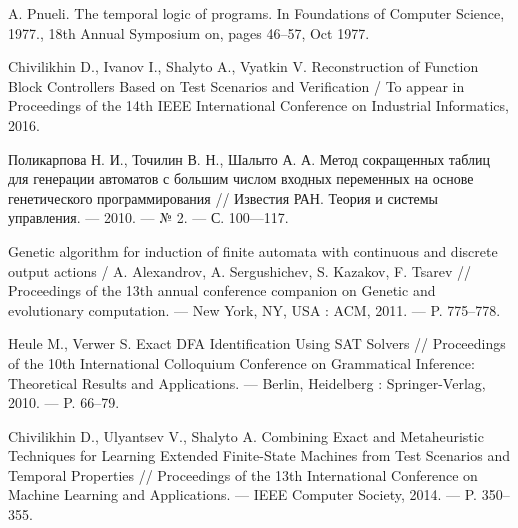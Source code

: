 \documentclass[14pt]{extarticle}
\theoremstyle{plain}
\theoremstyle{definition}
\begin{document}
\begin{thebibliography}{99}
A. Pnueli. The temporal logic of programs.
In Foundations of Computer Science, 1977., 18th Annual Symposium on, pages 46–57, Oct 1977.

Chivilikhin D., Ivanov I., Shalyto A., Vyatkin V. Reconstruction of Function Block
Controllers Based on Test Scenarios and Verification / To appear in Proceedings of
the 14th IEEE International Conference on Industrial Informatics, 2016.

Поликарпова Н. И., Точилин В. Н., Шалыто А. А.
Метод сокращенных таблиц для генерации автоматов с большим числом входных
переменных на основе генетического программирования // Известия РАН.
Теория и системы управления. — 2010. — № 2. — С. 100—117.

Genetic algorithm for induction of finite automata with continuous and
discrete output actions / A. Alexandrov, A. Sergushichev, S. Kazakov,
F. Tsarev // Proceedings of the 13th annual conference companion on
Genetic and evolutionary computation. — New York, NY, USA : ACM,
2011. — P. 775–778.

Heule M., Verwer S. Exact DFA Identification Using SAT Solvers // Proceedings
of the 10th International Colloquium Conference on Grammatical
Inference: Theoretical Results and Applications. — Berlin, Heidelberg
: Springer-Verlag, 2010. — P. 66–79.

Chivilikhin D., Ulyantsev V., Shalyto A. Combining Exact and Metaheuristic
Techniques for Learning Extended Finite-State Machines from
Test Scenarios and Temporal Properties // Proceedings of the 13th International
Conference on Machine Learning and Applications. — IEEE
Computer Society, 2014. — P. 350–355.

\end{thebibliography}
\end{document}
